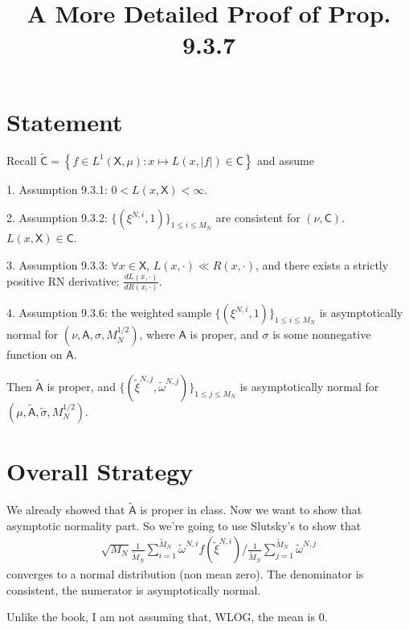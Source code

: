 \documentclass{article}
\title{A More Detailed Proof of Prop. 9.3.7}
\begin{document}
\maketitle


\section{Statement}

Recall $\tilde{\mathsf{C}} = \left\{ f \in L^1(\mathsf{X}, \mu) : x \mapsto L(x, |f|) \in \mathsf{C}  \right\}$ and assume 

1. Assumption 9.3.1: $0 < L(x,\mathsf{X}) < \infty$.

2. Assumption 9.3.2: $\{(\xi^{N,i},1)\}_{1 \le i \le M_N}$ are consistent for $(\nu, \mathsf{C})$. $L(x,\mathsf{X}) \in \mathsf{C}$.

3. Assumption 9.3.3: $\forall x \in \mathsf{X}$, $L(x, \cdot) \ll R(x, \cdot)$, and there exists a strictly positive RN derivative: $\frac{dL(x,\cdot )}{dR(x, \cdot)}$.

4. Assumption 9.3.6: the weighted sample $\{(\xi^{N,i}, 1)\}_{1 \le i \le M_N}$ is asymptotically normal for $(\nu, \mathsf{A}, \sigma, M_N^{1/2})$, where $\mathsf{A}$ is proper, and $\sigma$ is some nonnegative function on $\mathsf{A}$.

Then $\tilde{\mathsf{A}}$ is proper, and $\{ (\tilde{\xi}^{N,j}, \tilde{\omega}^{N,j} )\}_{1 \le j \le M_N}$ is asymptotically normal for $(\mu, \tilde{\mathsf{A}}, \tilde{\sigma}, M_N^{1/2})$.





\section{Overall Strategy}

We already showed that $\tilde{\mathsf{A}}$ is proper in class. Now we want to show that asymptotic normality part. So we're going to use Slutsky's to show that
\begin{align*}
\sqrt{M_N} \frac{1}{\tilde{M}_N} \sum_{i=1}^{\tilde{M}_N} \tilde{\omega}^{N,i} f(\tilde{\xi}^{N,i}) 
\bigg/ \frac{1}{\tilde{M}_N} \sum_{j=1}^{\tilde{M}_N} \tilde{\omega}^{N,j}
\end{align*}
converges to a normal distribution (non mean zero). The denominator is consistent, the numerator is asymptotically normal.

Unlike the book, I am not assuming that, WLOG, the mean is $0$.
\end{document}
